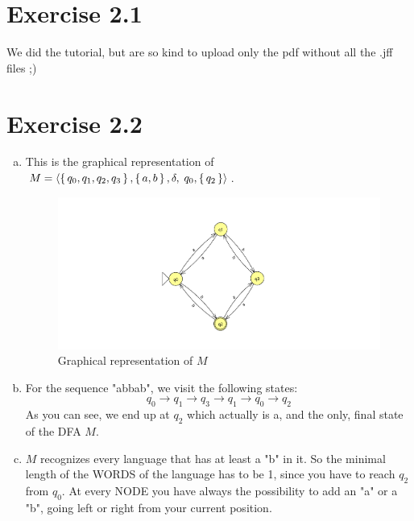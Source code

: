 \documentclass{article} %
\newcommand{\homeworkNumber}{2}
\begin{document}
\section*{Exercise \homeworkNumber.1}
We did the tutorial, but are so kind to upload only the pdf without all the
.jff files ;)

\section*{Exercise \homeworkNumber.2}
\begin{enumerate}[(a)]
	\item
	This is the graphical representation of $M = \left \langle
		\set{q_0, q_1, q_2, q_3}, \set{a, b}, \delta,\; q_0, \set{q_2}
		\right \rangle$.
	\begin{figure}[H]
		\includegraphics[width=\linewidth]{ex2a.png}
		\centering
		\caption{Graphical representation of $M$}
	\end{figure}

	\item
	For the sequence "abbab", we visit the following states:
	$$
	q_0 \to q_1 \to q_3 \to q_1 \to q_0 \to q_2
	$$
	As you can see, we end up at $q_2$ which actually is a, and the only, final state of the DFA $M$.

	\item
	$M$ recognizes every language that has at least a "b" in it. So the minimal length of the WORDS
	of the language has to be 1, since you have to reach $q_2$ from $q_0$. At every NODE you have always
	the possibility to add an "a" or a "b", going left or right from your current position.

\end{enumerate}

\clearpage
\end{document}
